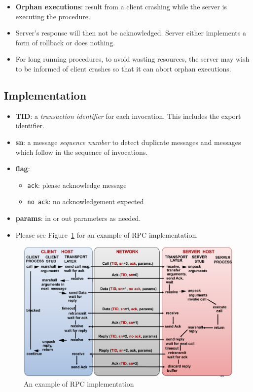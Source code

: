 \documentclass[twocolumn,landscape,10pt]{article}
\theoremstyle{definition}
\begin{document}
\begin{itemize}
    \item \textbf{Orphan executions}: result from a client crashing while the
        server is executing the procedure.
    \item Server's response will then not be acknowledged. Server either
        implements a form of rollback or does nothing.
    \item For long running procedures, to avoid wasting resources, the server
        may wish to be informed of client crashes so that it can abort orphan
        executions.
\end{itemize} 


\subsection{Implementation}

\begin{itemize}
    \item \textbf{TID}: a \emph{transaction identifier} for each invocation. This
        includes the export identifier.
    \item \textbf{sn}: a message \emph{sequence number} to detect duplicate
        messages and messages which follow in the sequence of invocations.
    \item \textbf{flag}:
        \begin{itemize}
            \item \texttt{ack}: please acknowledge message
            \item \texttt{no ack}: no acknowledgement expected
        \end{itemize} 
    \item \textbf{params}: in or out parameters as needed.
    \item Please see Figure~\ref{fig:rpc} for an example of RPC implementation.
\end{itemize} 

\begin{figure}[h]
  	\includegraphics[scale=0.33]{rpc_impl.png}
  	\centering
  	\caption{An example of RPC implementation}\label{fig:rpc}
\end{figure}
\end{document}
